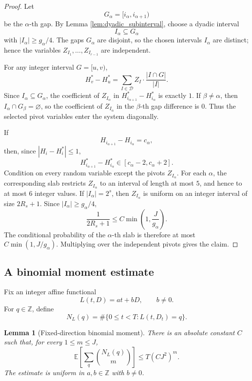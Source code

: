 \documentclass[11pt]{article}
\newtheorem{lemma}[theorem]{Lemma}
\theoremstyle{definition}
\theoremstyle{remark}
\newcommand{\E}{\mathbb E}
\newcommand{\Z}{\mathbb Z}
\newcommand{\1}{\mathbf 1}
\begin{document}
\begin{proof}
Let
\[
G_\alpha=[i_\alpha,i_{\alpha+1})
\]
be the $\alpha$-th gap.  By Lemma \ref{lem:dyadic_subinterval}, choose a dyadic interval
\[
I_\alpha\subseteq G_\alpha
\]
with $|I_\alpha|\ge g_\alpha/4$.  The gaps $G_\alpha$ are disjoint, so the chosen intervals $I_\alpha$ are distinct; hence the variables $Z_{I_1},\ldots,Z_{I_{r-1}}$ are independent.

\bigskip
\noindent
For any integer interval $G=[u,v)$,
\[
H_v^*-H_u^*
=\sum_{I\in\mathcal D}Z_I\cdot\frac{|I\cap G|}{|I|}.
\]
Since $I_\alpha\subseteq G_\alpha$, the coefficient of $Z_{I_\alpha}$ in $H_{i_{\alpha+1}}^*-H_{i_\alpha}^*$ is exactly $1$.  If $\beta\ne\alpha$, then $I_\alpha\cap G_\beta=\varnothing$, so the coefficient of $Z_{I_\alpha}$ in the $\beta$-th gap difference is $0$.  Thus the selected pivot variables enter the system diagonally.

\bigskip
\noindent
If
\[
H_{i_{\alpha+1}}-H_{i_\alpha}=c_\alpha,
\]
then, since $|H_i-H_i^*|\le1$,
\[
H_{i_{\alpha+1}}^*-H_{i_\alpha}^*\in[c_\alpha-2,c_\alpha+2].
\]
Condition on every random variable except the pivots $Z_{I_\alpha}$.  For each $\alpha$, the corresponding slab restricts $Z_{I_\alpha}$ to an interval of length at most $5$, and hence to at most $6$ integer values. If $|I_\alpha|=2^s$, then $Z_{I_\alpha}$ is uniform on an integer interval of size $2R_s+1$.  Since $|I_\alpha|\ge g_\alpha/4$,
\[
\frac{1}{2R_s+1}\le C\min\left(1,\frac{J}{g_\alpha}\right).
\]
The conditional probability of the $\alpha$-th slab is therefore at most $C\min(1,J/g_\alpha)$.  Multiplying over the independent pivots gives the claim.
\end{proof}

\subsection{A binomial moment estimate}

Fix an integer affine functional
\[
L(t,D)=at+bD,
\qquad b\ne0.
\]
For $q\in\Z$, define
\[
N_L(q)=\#\{0\le t<T:L(t,D_t)=q\}.
\]

\begin{lemma}[Fixed-direction binomial moment]\label{lem:dyadic_moment}
There is an absolute constant $C$ such that, for every $1\le m\le J$,
\[
\E\left[\sum_q\binom{N_L(q)}{m}\right]
\le
T(CJ^2)^m.
\]
The estimate is uniform in $a,b\in\Z$ with $b\ne0$.
\end{lemma}
\end{document}
